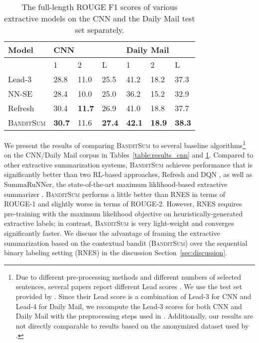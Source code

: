 \documentclass[11pt,a4paper]{article}
\newcommand{\B}{\textsc{BanditSum }}
\begin{document}
\begin{table}[!h]
\small
\centering
\setlength\tabcolsep{4 pt}
\begin{tabular}{|l|l|l|l|l|l|l|}
\hline
Model & \multicolumn{3}{l|}{CNN} & \multicolumn{3}{l|}{Daily Mail} \\ \hline
 & 1 & 2 & L & 1 & 2 & L   \\ \hline
Lead-3 & 28.8 & 11.0 & 25.5 & 41.2 & 18.2 & 37.3 \\
NN-SE & 28.4 & 10.0 & 25.0 & 36.2 & 15.2 & 32.9 \\
Refresh & 30.4 & \textbf{11.7} & 26.9& 41.0 & 18.8 & 37.7 \\ 
\B & \textbf{30.7} & 11.6 & \textbf{27.4} & \textbf{42.1} & \textbf{18.9} &  \textbf{38.3}\\  
\hline
\end{tabular}
\caption{The full-length ROUGE F1 scores of various extractive models on the CNN and the Daily Mail test set separately.}
\label{table:daily_mail}
\end{table}

We present the results of comparing \B to several baseline algorithms\footnote{
Due to different pre-processing methods and different numbers of selected sentences, several papers report different Lead scores \citep{DBLP:Narayan/2018,abs4_SeeLM17}. 
We use the test set provided by \citet{DBLP:Narayan/2018}. Since their Lead score is a combination of Lead-3 for CNN and Lead-4 for Daily Mail, we recompute the Lead-3 scores for both CNN and Daily Mail with the preprocessing steps used in \citet{abs4_SeeLM17}. Additionally, our results are not directly comparable to results based on the anonymized dataset used by \citet{ext5_summarunner}.} 
on the CNN/Daily Mail corpus in Tables~\ref{table:results_cnn} and \ref{table:daily_mail}. 
Compared to other extractive summarization systems, \B achieves performance that is significantly better than two RL-based approaches, Refresh \citep{DBLP:Narayan/2018} and DQN \citep{yao2018deep}, as well as SummaRuNNer, the state-of-the-art maximum liklihood-based extractive summarizer \cite{ext5_summarunner}. \B performs a little better than RNES \citep{DBLP:conf/aaai/WuH18} in terms of ROUGE-1 and slightly worse in terms of ROUGE-2. However, RNES requires pre-training with the maximum likelihood objective on heuristically-generated extractive labels; in contrast, \B is very light-weight and converges significantly faster. We discuss the advantage of framing the extractive summarization based on the contextual bandit (\textsc{BanditSum}) over the sequential binary labeling setting (RNES) in the discussion Section~\ref{sec:discussion}. 
\end{document}
